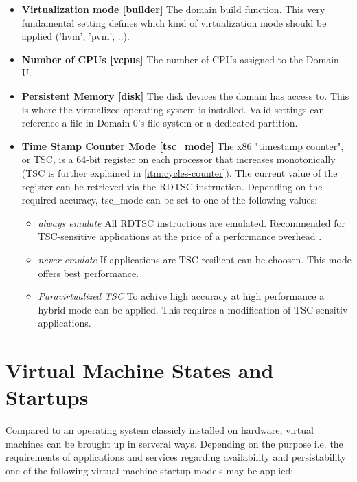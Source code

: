 \begin{itemize}
	\item \textbf{Virtualization mode [\textsf{builder}]} The domain build function. This very fundamental setting defines which kind of virtualization mode should be applied ('hvm', 'pvm', ..).
	\item \textbf{Number of CPUs [\textsf{vcpus}]} The number of CPUs assigned to the Domain U.
	
	\item \textbf{Persistent Memory [\textsf{disk}]} The disk devices the domain has access to. This is where the virtualized operating system is installed. Valid settings can reference a file in Domain 0's file system or a dedicated partition.

	\item \textbf{Time Stamp Counter Mode [\textsf{tsc\_mode}]} The x86 "timestamp counter", or TSC, is a 64-bit register on each processor that increases monotonically \cite{xentscmode} (TSC is further explained in \ref{itm:cycles-counter}). The current value of the register can be retrieved via the \textsf{RDTSC} instruction. Depending on the required accuracy, \textsf{tsc\_mode} can be set to one of the following values:
	\begin{itemize}
		\item \textit{always emulate} All \textsf{RDTSC} instructions are emulated. Recommended for TSC-sensitive applications at the price of a performance overhead \cite{xentscmode}.
		\item \textit{never emulate} If applications are TSC-resilient can be choosen. This mode offers best performance.
		\item \textit{Paravirtualized TSC} To achive high accuracy at high performance a hybrid mode can be applied. This requires a modification of TSC-sensitiv applications.
	\end{itemize}
\end{itemize}


\section{Virtual Machine States and Startups}
Compared to an operating system classicly installed on hardware, virtual machines can be brought up in serveral ways. Depending on the purpose i.e. the requirements of applications and services regarding availability and persistability one of the following virtual machine startup models may be applied:


